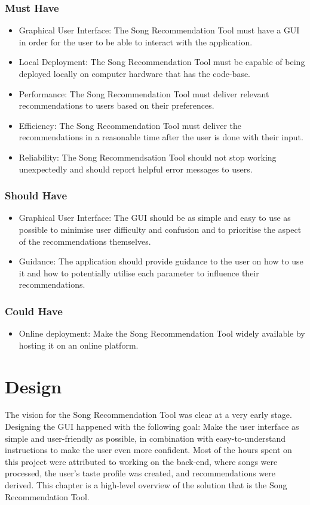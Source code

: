 \documentclass{l4proj}
\begin{document}
\subsection{Must Have}
\begin{itemize}
    \item Graphical User Interface: The Song Recommendation Tool must have a GUI in order for the user to be able to interact with the application.
    \item Local Deployment: The Song Recommendation Tool must be capable of being deployed locally on computer hardware that has the code-base.
    \item Performance: The Song Recommendation Tool must deliver relevant recommendations to users based on their preferences.
    \item Efficiency: The Song Recommendation Tool must deliver the recommendations in a reasonable time after the user is done with their input.
    \item Reliability: The Song Recommendsation Tool should not stop working unexpectedly and should report helpful error messages to users.
\end{itemize}
\subsection{Should Have}
\begin{itemize}
    \item Graphical User Interface: The GUI should be as simple and easy to use as possible to minimise user difficulty and confusion and to prioritise the aspect of the recommendations themselves.
    \item Guidance: The application should provide guidance to the user on how to use it and how to potentially utilise each parameter to influence their recommendations.
\end{itemize}
\subsection{Could Have}
\begin{itemize}
    \item Online deployment: Make the Song Recommendation Tool widely available by hosting it on an online platform.
    
\end{itemize}
\chapter{Design}
The vision for the Song Recommendation Tool was clear at a very early stage. Designing the GUI happened with the following goal: Make the user interface as simple and user-friendly as possible, in combination with easy-to-understand instructions to make the user even more confident. Most of the hours spent on this project were attributed to working on the back-end, where songs were processed, the user's taste profile was created, and recommendations were derived. This chapter is a high-level overview of the solution that is the Song Recommendation Tool.
\end{document}
